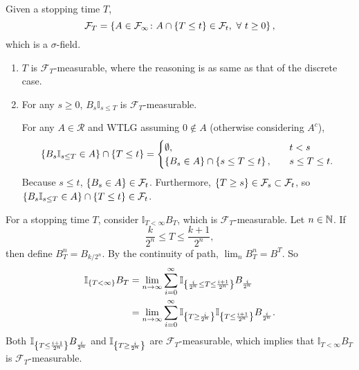 \begin{defn}
    Given a stopping time $T$,
    \begin{equation*}
        \mathcal{F}_T = \left\{A \in \mathcal{F}_\infty \colon A \cap \left\{T \leq t\right\} \in \mathcal{F}_t,~\forall~t\geq 0\right\},
    \end{equation*}
    which is a $\sigma$-field.
\end{defn}
\begin{rmk}
    \begin{enumerate}[label=(\arabic{*})]
        \item $T$ is $\mathcal{F}_T$-measurable, where the reasoning is as same as that of the discrete case.
        \item For any $s \geq 0$, $B_s\mathbb{I}_{s \leq T}$ is $\mathcal{F}_T$-measurable.

        \noindent For any $A \in \mathcal{R}$ and WTLG assuming $0 \notin A$ (otherwise considering $A^c$),
        \begin{align*}
            \left\{B_s\mathbb{I}_{s \leq T} \in A\right\} \cap \left\{T \leq t\right\} = 
            \begin{cases}
                \emptyset,&\quad t < s \\
                \left\{B_s \in A\right\} \cap \left\{s \leq T \leq t\right\},&\quad s\leq T \leq t.
            \end{cases}
        \end{align*}
        Because $s \leq t$, $\left\{B_s \in A\right\} \in \mathcal{F}_t$. Furthermore, $\left\{T \geq s\right\} \in \mathcal{F}_s \subset \mathcal{F}_t$, so $\left\{B_s\mathbb{I}_{s \leq T} \in A\right\} \cap \left\{T \leq t\right\} \in \mathcal{F}_t$.
    \end{enumerate}
\end{rmk}

\noindent For a stopping time $T$, consider $\mathbb{I}_{T < \infty}B_T$, which is $\mathcal{F}_T$-measurable. Let $n \in \mathbb{N}$. If
\begin{equation*}
    \frac{k}{2^n} \leq T \leq \frac{k+1}{2^n},
\end{equation*}
then define $B^n_T = B_{k/2^n}$. By the continuity of path, $\lim_n B^n_T = B^T$. So
\begin{align*}
    \mathbb{I}_{\left\{T < \infty\right\}}B_T &= \lim_{n\rightarrow \infty} \sum_{i = 0}^\infty \mathbb{I}_{\left\{\frac{i}{2^n} \leq T \leq \frac{i+1}{2^n}\right\}} B_{\frac{i}{2^n}} \\
    &= \lim_{n\rightarrow \infty} \sum_{i = 0}^\infty \mathbb{I}_{\left\{T \geq \frac{i}{2^n} \right\}}\mathbb{I}_{\left\{T \leq \frac{i+1}{2^n}\right\}} B_{\frac{i}{2^n}}. 
\end{align*}
Both $\mathbb{I}_{\left\{T \leq \frac{i+1}{2^n}\right\}} B_{\frac{i}{2^n}}$ and $\mathbb{I}_{\left\{T \geq \frac{i}{2^n} \right\}}$ are $\mathcal{F}_T$-measurable, which implies that $\mathbb{I}_{T < \infty}B_T$ is $\mathcal{F}_T$-measurable.

